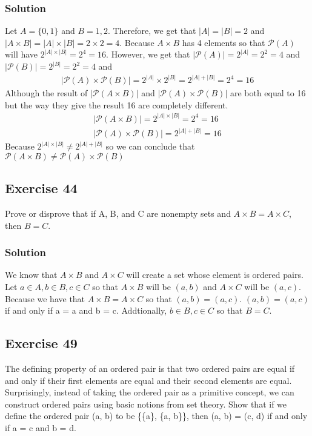 \documentclass{article}
\theoremstyle{mytheoremstyle}
\theoremstyle{mytheoremstyle}
\theoremstyle{myproblemstyle}
\begin{document}
    \subsubsection*{Solution}
        Let \(A = \{0, 1\}\) and \(B = {1, 2}\). Therefore, we get that \(|A| = |B| = 2\) and \(|A \times B| = |A| \times |B| = 2 \times 2 = 4\).
        Because \(A \times B\) has 4 elements so that \(\mathcal{P}(A)\) will have \(2^{|A|\times|B|} = 2^4 = 16\). However, we get that
        \(|\mathcal{P}(A)| = 2^{|A|} = 2^2 = 4\) and \(|\mathcal{P}(B)| = 2^{|B|} = 2^2 = 4\) and
        \begin{align*}
            |\mathcal{P}(A) \times \mathcal{P}(B)| = 2^{|A|}\times 2^{|B|} = 2^{|A| + |B|} = 2^4 =16
        \end{align*}
        Although the result of \(|\mathcal{P}(A\times B)|\) and \(|\mathcal{P}(A) \times \mathcal{P}(B)|\) are both equal to
        16 but the way they give the result 16 are completely different.
        \begin{align*}
            |\mathcal{P}(A\times B)| = 2^{|A| \times |B|} = 2^4 = 16\\
            |\mathcal{P}(A) \times \mathcal{P}(B)| = 2^{|A| + |B|} = 16
        \end{align*}
        Because \(2^{|A| \times |B|} \neq 2^{|A| + |B|}\) so we can conclude that \(\mathcal{P}(A \times B) \neq \mathcal{P}(A) \times \mathcal{P}(B)\)
    \subsection*{Exercise 44}
        Prove or disprove that if A, B, and C are nonempty sets and \(A \times B = A \times C\), then \(B = C\).
    \subsubsection*{Solution}
        We know that \(A \times B\) and \(A \times C\) will create a set whose element is ordered pairs. 
        Let \(a \in A, b \in B, c \in C\) so that \(A \times B\) will be \((a, b)\) and \(A \times C\) will be \((a, c)\).
        Because we have that \(A \times B = A \times C\) so that \((a,b) = (a,c)\). \((a,b) = (a,c)\) if and only if a = a and b = c.
        Addtionally, \(b \in B, c \in C\) so that \(B = C\).
    \subsection*{Exercise 49}
    The defining property of an ordered pair is that two ordered pairs are equal if and only if their first elements are
    equal and their second elements are equal. Surprisingly, instead of taking the ordered pair as a primitive concept, we can construct ordered pairs using basic notions from set theory. Show that if we define the ordered pair
    (a, b) to be \{\{a\}, \{a, b\}\}, then (a, b) = (c, d) if and only if a = c and b = d.
\end{document}
